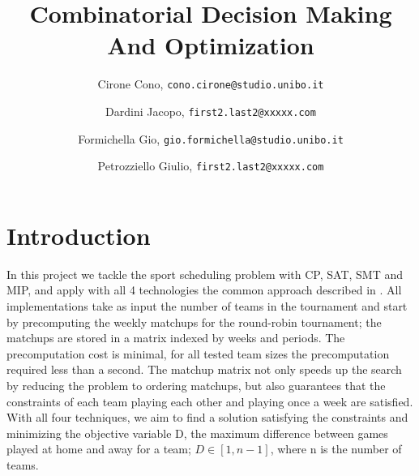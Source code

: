 \documentclass{article}
\title{Combinatorial Decision Making And Optimization}
\author{
  Cirone Cono, \texttt{cono.cirone@studio.unibo.it}
  \and
  Dardini Jacopo, \texttt{first2.last2@xxxxx.com}
  \and
  Formichella Gio, \texttt{gio.formichella@studio.unibo.it}
  \and
  Petrozziello Giulio, \texttt{first2.last2@xxxxx.com}
}
\date{}
\begin{document}
\maketitle


\section{Introduction}
In this project we tackle the sport scheduling problem with CP, SAT, SMT and MIP, and apply with all 4 technologies the common approach described in \cite{10.1007/10704567_6}. All implementations take as input the number of teams in the tournament and start by precomputing the weekly matchups for the round-robin tournament; the matchups are stored in a matrix indexed by weeks and periods. The precomputation cost is minimal, for all tested team sizes the precomputation required less than a second. The matchup matrix not only speeds up the search by reducing the problem to ordering matchups, but also guarantees that the constraints of each team playing each other and playing once a week are satisfied. With all four techniques, we aim to find a solution satisfying the constraints and minimizing the objective variable D, the maximum difference between games played at home and away for a team; $D\in [1, n-1]$, where n is the number of teams. 











\end{document}
